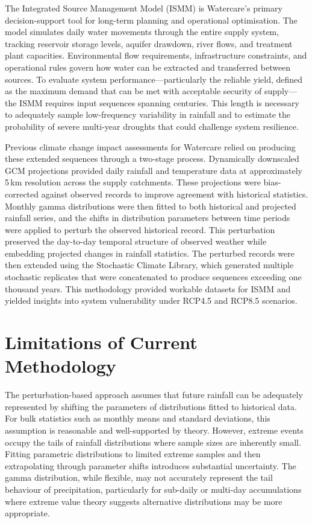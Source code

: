 The Integrated Source Management Model (ISMM) is Watercare's primary decision-support tool 
for 
long-term planning and operational optimisation. The model simulates daily water movements 
through the entire supply system, tracking reservoir storage levels, aquifer drawdown, river 
flows, and treatment plant capacities. Environmental flow requirements, infrastructure 
constraints, and operational rules govern how water can be extracted and transferred between 
sources. To evaluate system performance---particularly the reliable yield, defined as the 
maximum demand that can be met with acceptable security of supply---the ISMM requires input 
sequences spanning centuries. This length is necessary to adequately sample low-frequency 
variability in rainfall and to estimate the probability of severe multi-year droughts that 
could challenge system resilience.

Previous climate change impact assessments for Watercare relied on producing these extended 
sequences through a two-stage process. Dynamically downscaled GCM projections provided daily 
rainfall and temperature data at approximately 5\,km resolution across the supply catchments. 
These projections were bias-corrected against observed records to improve agreement with 
historical statistics. Monthly gamma distributions were then fitted to both historical and 
projected rainfall series, and the shifts in distribution parameters between time periods 
were applied to perturb the observed historical record. This perturbation preserved the 
day-to-day temporal structure of observed weather while embedding projected changes in rainfall 
statistics. The perturbed records were then extended using the Stochastic Climate Library, 
which generated multiple stochastic replicates that were concatenated to produce sequences 
exceeding one thousand years. This methodology provided workable datasets for ISMM and yielded 
insights into system vulnerability under RCP4.5 and RCP8.5 scenarios.

\section{Limitations of Current Methodology}

The perturbation-based approach assumes that future rainfall can be adequately represented by 
shifting the parameters of distributions fitted to historical data. For bulk statistics such as 
monthly means and standard deviations, this assumption is reasonable and well-supported by theory. 
However, extreme events occupy the tails of rainfall distributions where sample sizes are 
inherently small. Fitting parametric distributions to limited extreme samples and then 
extrapolating through parameter shifts introduces substantial uncertainty. The gamma 
distribution, while flexible, may not accurately represent the tail behaviour of precipitation, 
particularly for sub-daily or multi-day accumulations where extreme value theory suggests 
alternative distributions may be more appropriate.

